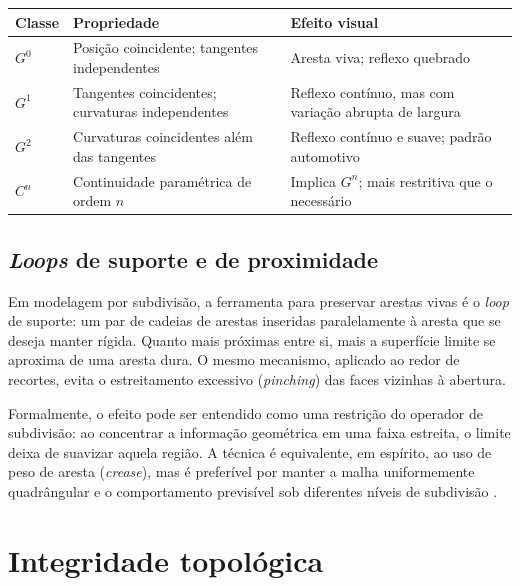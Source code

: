 \begin{quadro}[htbp]
\centering
\caption{Classes de continuidade geom\'etrica entre superf\'icies}
\label{qua:continuidade}
\footnotesize
\begin{tabular}{>{\raggedright\arraybackslash}p{1.9cm}>{\raggedright\arraybackslash}p{5.0cm}>{\raggedright\arraybackslash}p{6.8cm}}
\toprule
\textbf{Classe} & \textbf{Propriedade} & \textbf{Efeito visual} \\
\midrule
$G^0$ & Posi\c{c}\~ao coincidente; tangentes independentes & Aresta viva; reflexo quebrado \\
$G^1$ & Tangentes coincidentes; curvaturas independentes & Reflexo cont\'inuo, mas com varia\c{c}\~ao abrupta de largura \\
$G^2$ & Curvaturas coincidentes al\'em das tangentes & Reflexo cont\'inuo e suave; padr\~ao automotivo \\
$C^n$ & Continuidade param\'etrica de ordem $n$ & Implica $G^n$; mais restritiva que o necess\'ario \\
\bottomrule
\end{tabular}
\end{quadro}

\subsection{\emph{Loops} de suporte e de proximidade}

Em modelagem por subdivis\~ao, a ferramenta para preservar arestas vivas \'e o \emph{loop} de
suporte: um par de cadeias de arestas inseridas paralelamente \`a aresta que se deseja manter
r\'igida. Quanto mais pr\'oximas entre si, mais a superf\'icie limite se aproxima de uma aresta
dura. O mesmo mecanismo, aplicado ao redor de recortes, evita o estreitamento excessivo
(\emph{pinching}) das faces vizinhas \`a abertura.

Formalmente, o efeito pode ser entendido como uma restri\c{c}\~ao do operador de subdivis\~ao:
ao concentrar a informa\c{c}\~ao geom\'etrica em uma faixa estreita, o limite deixa de suavizar
aquela regi\~ao. A t\'ecnica \'e equivalente, em esp\'irito, ao uso de peso de aresta
(\emph{crease}), mas \'e prefer\'ivel por manter a malha uniformemente quadr\^angular e o
comportamento previs\'ivel sob diferentes n\'iveis de subdivis\~ao \cite{bbotsch2010}.

\section{Integridade topol\'ogica}

